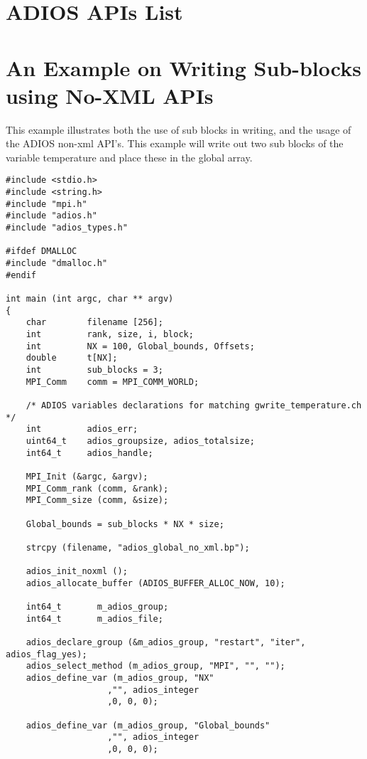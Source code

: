 \section{ADIOS APIs List}



\section{An Example on Writing Sub-blocks using No-XML APIs}
\label{section-appendix-writing-subblocks}

This example illustrates both the use of sub blocks in writing, and the usage of 
the ADIOS non-xml API's. This example will write out two sub blocks of the variable 
temperature and place these in the global array. 

\begin{lstlisting}[alsolanguage=C]
#include <stdio.h>
#include <string.h>
#include "mpi.h"
#include "adios.h"
#include "adios_types.h"

#ifdef DMALLOC
#include "dmalloc.h"
#endif

int main (int argc, char ** argv)
{
    char        filename [256];
    int         rank, size, i, block;
    int         NX = 100, Global_bounds, Offsets;
    double      t[NX];
    int         sub_blocks = 3;
    MPI_Comm    comm = MPI_COMM_WORLD;

    /* ADIOS variables declarations for matching gwrite_temperature.ch */
    int         adios_err;
    uint64_t    adios_groupsize, adios_totalsize;
    int64_t     adios_handle;

    MPI_Init (&argc, &argv);
    MPI_Comm_rank (comm, &rank);
    MPI_Comm_size (comm, &size);

    Global_bounds = sub_blocks * NX * size;

    strcpy (filename, "adios_global_no_xml.bp");

    adios_init_noxml ();
    adios_allocate_buffer (ADIOS_BUFFER_ALLOC_NOW, 10);

    int64_t       m_adios_group;
    int64_t       m_adios_file;

    adios_declare_group (&m_adios_group, "restart", "iter", adios_flag_yes);
    adios_select_method (m_adios_group, "MPI", "", "");
    adios_define_var (m_adios_group, "NX"
                    ,"", adios_integer
                    ,0, 0, 0);

    adios_define_var (m_adios_group, "Global_bounds"
                    ,"", adios_integer
                    ,0, 0, 0);


\end{lstlisting}

